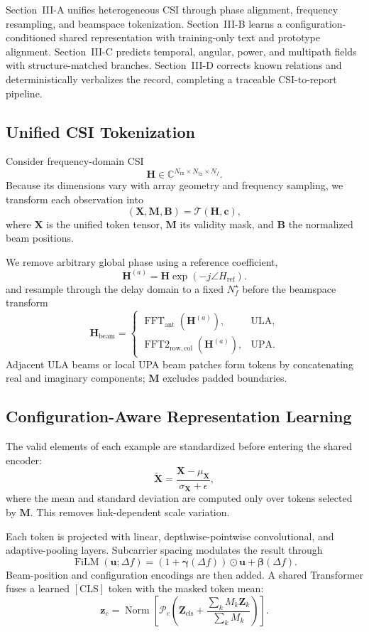 \documentclass[conference]{IEEEtran}
\begin{document}
Section~III-A unifies heterogeneous CSI through phase alignment, frequency resampling, and beamspace
tokenization. Section~III-B learns a configuration-conditioned shared representation with training-only
text and prototype alignment. Section~III-C predicts temporal, angular, power, and multipath fields with
structure-matched branches. Section~III-D corrects known relations and deterministically verbalizes the
record, completing a traceable CSI-to-report pipeline.

\subsection{Unified CSI Tokenization}

Consider frequency-domain CSI
\[
\mathbf H\in\mathbb C^{N_{\mathrm{rx}}\times N_{\mathrm{tx}}\times N_f}.
\]
Because its dimensions vary with array geometry and frequency sampling, we transform each observation into
\[
(\mathbf X,\mathbf M,\mathbf B)=\mathcal T(\mathbf H,\mathbf c),
\]
where $\mathbf X$ is the unified token tensor, $\mathbf M$ its validity mask, and $\mathbf B$ the
normalized beam positions.

We remove arbitrary global phase using a reference coefficient,
\[
\mathbf H^{(a)}=\mathbf H\exp\!\left(-j\angle H_{\mathrm{ref}}\right).
\]
and resample through the delay domain to a fixed $N_f^\star$ before the beamspace transform
\[
\mathbf H_{\mathrm{beam}}=
\begin{cases}
\operatorname{FFT}_{\mathrm{ant}}(\mathbf H^{(a)}),&\text{ULA},\\
\operatorname{FFT2}_{\mathrm{row,col}}(\mathbf H^{(a)}),&\text{UPA}.
\end{cases}
\]
Adjacent ULA beams or local UPA beam patches form tokens by concatenating real and imaginary
components; $\mathbf M$ excludes padded boundaries.

\subsection{Configuration-Aware Representation Learning}

The valid elements of each example are standardized before entering the shared encoder:
\[
\widetilde{\mathbf X}=
\frac{\mathbf X-\mu_{\mathbf X}}{\sigma_{\mathbf X}+\epsilon},
\]
where the mean and standard deviation are computed only over tokens selected by $\mathbf M$.
This removes link-dependent scale variation.

Each token is projected with linear, depthwise-pointwise convolutional, and adaptive-pooling layers.
Subcarrier spacing modulates the result through
\[
\operatorname{FiLM}(\mathbf u;\Delta f)=
\left(1+\boldsymbol{\gamma}(\Delta f)\right)\odot\mathbf u+
\boldsymbol{\beta}(\Delta f).
\]
Beam-position and configuration encodings are then added. A shared Transformer fuses a learned
$[\mathrm{CLS}]$ token with the masked token mean:
\[
\mathbf z_c=\operatorname{Norm}\!\left[
\mathcal P_c\!\left(\mathbf Z_{\mathrm{cls}}+
\frac{\sum_k M_k\mathbf Z_k}{\sum_k M_k}\right)\right].
\]
\end{document}
